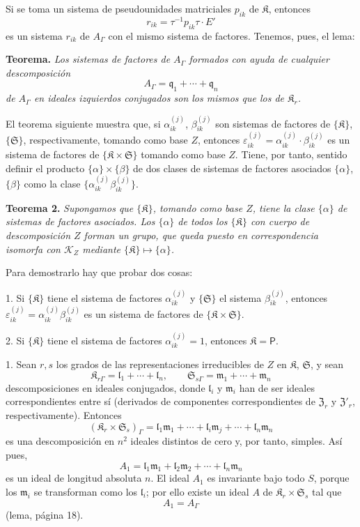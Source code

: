 Si se toma un sistema de pseudounidades matriciales \(p_{ik}\) de \(\mathfrak K\), entonces
\[
r_{ik}=\tau^{-1}p_{ik}\tau\cdot E'
\]
es un sistema \(r_{ik}\) de \(A_\Gamma\) con el mismo sistema de factores. Tenemos, pues, el lema:

\textbf{Teorema.} \emph{Los sistemas de factores de \(A_\Gamma\) formados con ayuda de cualquier descomposición}
\[
A_\Gamma=\mathfrak q_1+\cdots+\mathfrak q_n
\]
\emph{de \(A_\Gamma\) en ideales izquierdos conjugados son los mismos que los de \(\mathfrak K_r\).}

El teorema siguiente muestra que, si \(\alpha_{ik}^{(j)}\), \(\beta_{ik}^{(j)}\) son sistemas de factores de \(\{\mathfrak K\}\), \(\{\mathfrak S\}\), respectivamente, tomando como base \(Z\), entonces \(\varepsilon_{ik}^{(j)}=\alpha_{ik}^{(j)}\cdot\beta_{ik}^{(j)}\) es un sistema de factores de \(\{\mathfrak K\times\mathfrak S\}\) tomando como base \(Z\). Tiene, por tanto, sentido definir el producto \(\{\alpha\}\times\{\beta\}\) de dos clases de sistemas de factores asociados \(\{\alpha\}\), \(\{\beta\}\) como la clase \(\{\alpha_{ik}^{(j)}\beta_{ik}^{(j)}\}\).

\textbf{Teorema 2.} \emph{Supongamos que \(\{\mathfrak K\}\), tomando como base \(Z\), tiene la clase \(\{\alpha\}\) de sistemas de factores asociados. Los \(\{\alpha\}\) de todos los \(\{\mathfrak K\}\) con cuerpo de descomposición \(Z\) forman un grupo, que queda puesto en correspondencia isomorfa con \(\mathscr K_Z\) mediante \(\{\mathfrak K\}\mapsto\{\alpha\}\).}

Para demostrarlo hay que probar dos cosas:

1. Si \(\{\mathfrak K\}\) tiene el sistema de factores \(\alpha_{ik}^{(j)}\) y \(\{\mathfrak S\}\) el sistema \(\beta_{ik}^{(j)}\), entonces \(\varepsilon_{ik}^{(j)}=\alpha_{ik}^{(j)}\beta_{ik}^{(j)}\) es un sistema de factores de \(\{\mathfrak K\times\mathfrak S\}\).

2. Si \(\{\mathfrak K\}\) tiene el sistema de factores \(\alpha_{ik}^{(j)}=1\), entonces \(\mathfrak K=\mathsf P\).

1. Sean \(r,s\) los grados de las representaciones irreducibles de \(Z\) en \(\mathfrak K\), \(\mathfrak S\), y sean
\[
\mathfrak K_{r\Gamma}=\mathfrak l_1+\cdots+\mathfrak l_n,\qquad
\mathfrak S_{s\Gamma}=\mathfrak m_1+\cdots+\mathfrak m_n
\]
descomposiciones en ideales conjugados, donde \(\mathfrak l_i\) y \(\mathfrak m_i\) han de ser ideales correspondientes entre sí (derivados de componentes correspondientes de \(\mathfrak Z_r\) y \(\mathfrak Z'_r\), respectivamente). Entonces
\[
(\mathfrak K_r\times\mathfrak S_s)_\Gamma
=\mathfrak l_1\mathfrak m_1+\cdots+\mathfrak l_i\mathfrak m_j+\cdots+\mathfrak l_n\mathfrak m_n
\]
es una descomposición en \(n^2\) ideales distintos de cero y, por tanto, simples. Así pues,
\[
A_1=\mathfrak l_1\mathfrak m_1+\mathfrak l_2\mathfrak m_2+\cdots+\mathfrak l_n\mathfrak m_n
\]
es un ideal de longitud absoluta \(n\). El ideal \(A_1\) es invariante bajo todo \(S\), porque los \(\mathfrak m_i\) se transforman como los \(\mathfrak l_i\); por ello existe un ideal \(A\) de \(\mathfrak K_r\times\mathfrak S_s\) tal que
\[
A_1=A_\Gamma
\]
(lema, página 18).

